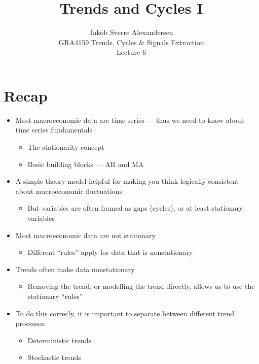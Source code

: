 \documentclass[10pt]{article}
\begin{document}
 
\title{Trends and Cycles I}
\author{Jakob Sverre Alexandersen\\
GRA4159 Trends, Cycles \& Signals Extraction\\
Lecture 6}
\maketitle

\tableofcontents
\newpage
\section{Recap}
\begin{itemize}
    \item Most macroeconomic data are time series --- thus we need to know about time series fundamentals
    \begin{itemize}
        \item The stationarity concept 
        \item Basic building blocks --- AR and MA 
    \end{itemize}
    \item A simple theory model helpful for making you think logically consistent about macroeconomic fluctuations 
    \begin{itemize}
        \item But variables are often framed as gaps (cycles), or at least stationary variables 
    \end{itemize}
    \item Most macroeconomic data are not stationary
    \begin{itemize}
        \item Different ``rules'' apply for data that is nonstationary 
    \end{itemize}
    \item Trends often make data nonstationary
    \begin{itemize}
        \item Removing the trend, or modelling the trend directly, allows us to use the stationary ``rules''
    \end{itemize}
    \item To do this correcly, it is important to separate between different trend processes:
    \begin{itemize}
        \item Deterministic trends 
        \item Stochastic trends 
    \end{itemize}
\end{itemize}
\end{document}
